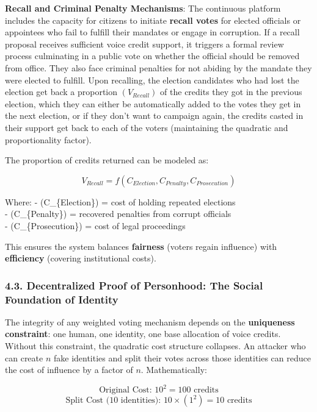 \textbf{Recall and Criminal Penalty Mechanisms}: The continuous platform
includes the capacity for citizens to initiate \textbf{recall votes} for
elected officials or appointees who fail to fulfill their mandates or
engage in corruption. If a recall proposal receives sufficient voice
credit support, it triggers a formal review process culminating in a
public vote on whether the official should be removed from office. They
also face criminal penalties for not abiding by the mandate they were
elected to fulfill. Upon recalling, the election candidates who had lost
the election get back a proportion \((V_{Recall})\) of the credits they
got in the previous election, which they can either be automatically
added to the votes they get in the next election, or if they don't want
to campaign again, the credits casted in their support get back to each
of the voters (maintaining the quadratic and proportionality factor).

The proportion of credits returned can be modeled as:

\[
V_{Recall} = f(C_{Election}, C_{Penalty}, C_{Prosecution})
\]

Where: - (C\_\{Election\}) = cost of holding repeated elections\\
- (C\_\{Penalty\}) = recovered penalties from corrupt officials\\
- (C\_\{Prosecution\}) = cost of legal proceedings

This ensures the system balances \textbf{fairness} (voters regain
influence) with \textbf{efficiency} (covering institutional costs).

\subsubsection{4.3. Decentralized Proof of Personhood: The Social
Foundation of
Identity}\label{decentralized-proof-of-personhood-the-social-foundation-of-identity}

The integrity of any weighted voting mechanism depends on the
\textbf{uniqueness constraint}: one human, one identity, one base
allocation of voice credits. Without this constraint, the quadratic cost
structure collapses. An attacker who can create \(n\) fake identities
and split their votes across those identities can reduce the cost of
influence by a factor of \(n\). Mathematically:

\[
\text{Original Cost: } 10^2 = 100 \text{ credits}
\] \[
\text{Split Cost (10 identities): } 10 \times (1^2) = 10 \text{ credits}
\]

